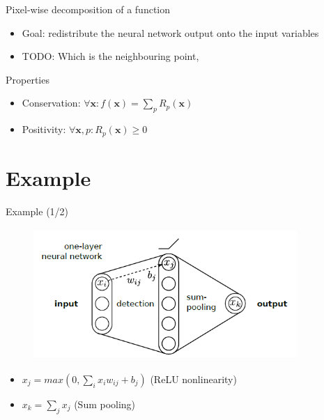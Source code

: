 \documentclass{beamer}
\begin{document}
\begin{frame}{Pixel-wise decomposition of a function}

\begin{itemize}
  \item Goal: redistribute the neural network output onto the input variables
  \item TODO: Which is the neighbouring point, 
\end{itemize}

\end{frame}
\begin{frame}{Properties}

\begin{itemize}
  \item Conservation: $\forall \mathbf{x}: f(\mathbf{x}) = \sum_p R_p(\mathbf{x})$
  \item Positivity: $\forall \mathbf{x}, p: R_p(\mathbf{x}) \geq 0$
\end{itemize}

\end{frame}
\section{Example}
\begin{frame}{Example (1/2)}

\begin{figure}[ht]
	\centering
    \includegraphics[width=10cm, height=5cm]{figures/one_layer_network}
	\label{fig:OneLayerNetwork}
\end{figure}

\begin{itemize}
\item $x_j = max(0, \sum_i x_i w_{ij} + b_j)$ (ReLU nonlinearity)
\item $x_k = \sum_j x_j$ (Sum pooling)
\end{itemize}

\end{frame}
\end{document}
